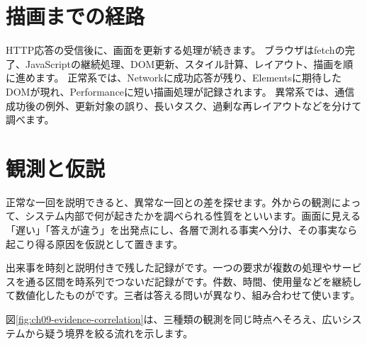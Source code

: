 \par
\endgroup
\par
\endgroup

\section{描画までの経路}

HTTP応答の受信後に、画面を更新する処理が続きます。
ブラウザはfetchの完了、JavaScriptの継続処理、DOM更新、スタイル計算、レイアウト、描画を順に進めます。
正常系では、Networkに成功応答が残り、Elementsに期待したDOMが現れ、Performanceに短い描画処理が記録されます。
異常系では、通信成功後の例外、更新対象の誤り、長いタスク、過剰な再レイアウトなどを分けて調べます。


\section{観測と仮説}
\label{sec:07-practice-07}

正常な一回を説明できると、異常な一回との差を探せます。外からの観測によって、システム内部で何が起きたかを調べられる性質をといいます。画面に見える「遅い」「答えが違う」を出発点にし、各層で測れる事実へ分け、その事実なら起こり得る原因を仮説として置きます。

出来事を時刻と説明付きで残した記録がです。一つの要求が複数の処理やサービスを通る区間を時系列でつないだ記録がです。件数、時間、使用量などを継続して数値化したものがです。三者は答える問いが異なり、組み合わせて使います。

図\ref{fig:ch09-evidence-correlation}は、三種類の観測を同じ時点へそろえ、広いシステムから疑う境界を絞る流れを示します。

